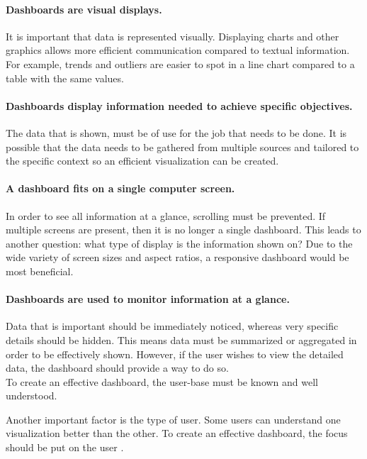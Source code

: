     \paragraph{Dashboards are visual displays.} It is important that data is represented visually. Displaying charts and other graphics allows more efficient communication compared to textual information. For example, trends and outliers are easier to spot in a line chart compared to a table with the same values.

    \paragraph{Dashboards display information needed to achieve specific objectives.} The data that is shown, must be of use for the job that needs to be done. It is possible that the data needs to be gathered from multiple sources and tailored to the specific context so an efficient visualization can be created.

    \paragraph{A dashboard fits on a single computer screen.} In order to see all information at a glance, scrolling must be prevented. If multiple screens are present, then it is no longer a single dashboard. This leads to another question: what type of display is the information shown on? Due to the wide variety of screen sizes and aspect ratios, a responsive dashboard would be most beneficial.

    \paragraph{Dashboards are used to monitor information at a glance.} Data that is important should be immediately noticed, whereas very specific details should be hidden. This means data must be summarized or aggregated in order to be effectively shown. However, if the user wishes to view the detailed data, the dashboard should provide a way to do so.\\

    \noindent To create an effective dashboard, the user-base must be known and well understood. 
    
    Another important factor is the type of user. Some users can understand one  visualization better than the other. To create an effective dashboard, the focus should be put on the user \cite{brath2004dashboard}.
    
